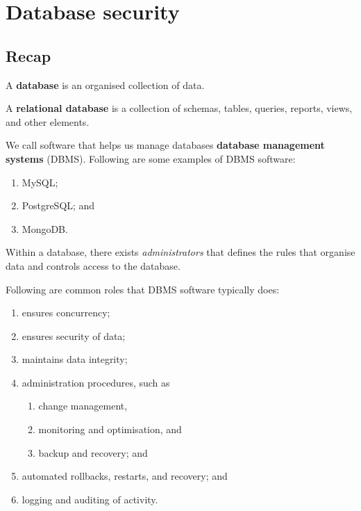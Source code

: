 \chapter{Database security}

\section{Recap}

\begin{definition}[Database]
    A \textbf{database} is an organised collection of data.
\end{definition}

\begin{definition}
    A \textbf{relational database} is a collection of schemas, tables, queries, reports, views, and other elements. %
\end{definition}

We call software that helps us manage databases \textbf{database management systems} (DBMS). Following are some examples of DBMS software:
\begin{enumerate}
    \item MySQL;
    \item PostgreSQL; and
    \item MongoDB.
\end{enumerate}

Within a database, there exists \emph{administrators} that defines the rules that organise data and controls access to the database.

Following are common roles that DBMS software typically does:
\begin{enumerate}
    \item ensures concurrency;
    \item ensures security of data;
    \item maintains data integrity;
    \item administration procedures, such as
        \begin{enumerate}
            \item change management,
            \item monitoring and optimisation, and
            \item backup and recovery; and
        \end{enumerate}
    \item automated rollbacks, restarts, and recovery; and
    \item logging and auditing of activity.
\end{enumerate}

